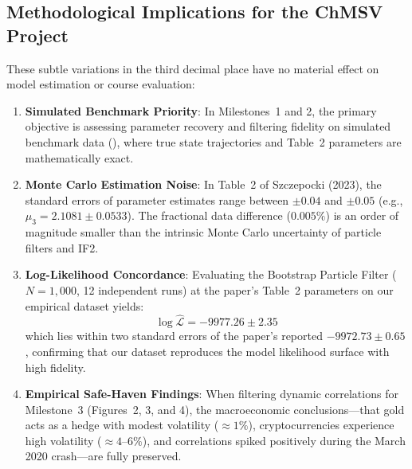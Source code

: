 \documentclass[11pt,a4paper]{article}
\begin{document}
\subsection{Methodological Implications for the ChMSV Project}
These subtle variations in the third decimal place have no material effect on model estimation or course evaluation:
\begin{enumerate}
    \item \textbf{Simulated Benchmark Priority}: In Milestones~1 and 2, the primary objective is assessing parameter recovery and filtering fidelity on simulated benchmark data (), where true state trajectories and Table~2 parameters are mathematically exact.
    \item \textbf{Monte Carlo Estimation Noise}: In Table~2 of Szczepocki (2023), the standard errors of parameter estimates range between $\pm 0.04$ and $\pm 0.05$ (e.g., $\mu_3 = 2.1081 \pm 0.0533$). The fractional data difference ($0.005\%$) is an order of magnitude smaller than the intrinsic Monte Carlo uncertainty of particle filters and IF2.
    \item \textbf{Log-Likelihood Concordance}: Evaluating the Bootstrap Particle Filter ($N = 1{,}000$, 12 independent runs) at the paper's Table~2 parameters on our empirical dataset yields:
    \begin{equation}
        \log \hat{\mathcal{L}} = -9977.26 \pm 2.35
    \end{equation}
    which lies within two standard errors of the paper's reported $-9972.73 \pm 0.65$, confirming that our dataset reproduces the model likelihood surface with high fidelity.
    \item \textbf{Empirical Safe-Haven Findings}: When filtering dynamic correlations for Milestone~3 (Figures~2, 3, and 4), the macroeconomic conclusions---that gold acts as a hedge with modest volatility ($\approx 1\%$), cryptocurrencies experience high volatility ($\approx 4\text{--}6\%$), and correlations spiked positively during the March 2020 crash---are fully preserved.
\end{enumerate}
\end{document}
